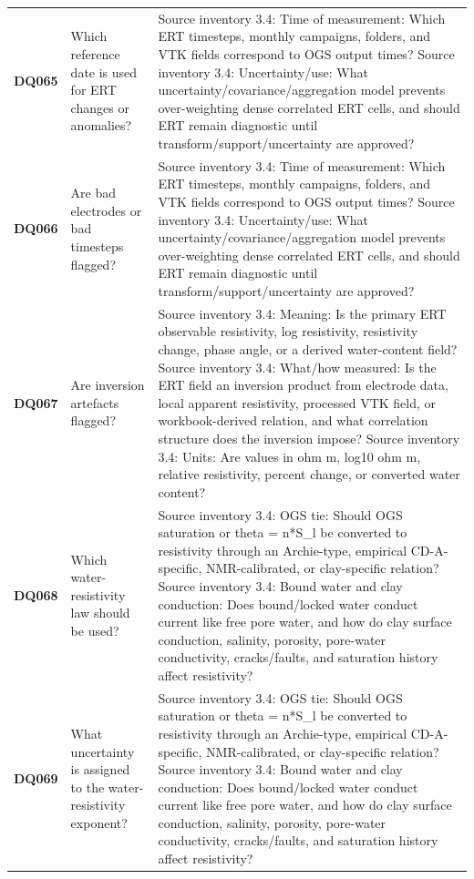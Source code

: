 \begin{longtable}{@{}L{0.09\textwidth} L{0.31\textwidth} L{0.52\textwidth}@{}}
\addlinespace[0.18em]
\textbf{DQ065} & Which reference date is used for ERT changes or anomalies? & Source inventory 3.4: Time of measurement: Which ERT timesteps, monthly campaigns, folders, and VTK fields correspond to OGS output times? Source inventory 3.4: Uncertainty/use: What uncertainty/covariance/aggregation model prevents over-weighting dense correlated ERT cells, and should ERT remain diagnostic until transform/support/uncertainty are approved?\\
\addlinespace[0.18em]
\textbf{DQ066} & Are bad electrodes or bad timesteps flagged? & Source inventory 3.4: Time of measurement: Which ERT timesteps, monthly campaigns, folders, and VTK fields correspond to OGS output times? Source inventory 3.4: Uncertainty/use: What uncertainty/covariance/aggregation model prevents over-weighting dense correlated ERT cells, and should ERT remain diagnostic until transform/support/uncertainty are approved?\\
\addlinespace[0.18em]
\textbf{DQ067} & Are inversion artefacts flagged? & Source inventory 3.4: Meaning: Is the primary ERT observable resistivity, log resistivity, resistivity change, phase angle, or a derived water-content field? Source inventory 3.4: What/how measured: Is the ERT field an inversion product from electrode data, local apparent resistivity, processed VTK field, or workbook-derived relation, and what correlation structure does the inversion impose? Source inventory 3.4: Units: Are values in ohm m, log10 ohm m, relative resistivity, percent change, or converted water content?\\
\addlinespace[0.18em]
\textbf{DQ068} & Which water-resistivity law should be used? & Source inventory 3.4: OGS tie: Should OGS saturation or theta = n*S\_l be converted to resistivity through an Archie-type, empirical CD-A-specific, NMR-calibrated, or clay-specific relation? Source inventory 3.4: Bound water and clay conduction: Does bound/locked water conduct current like free pore water, and how do clay surface conduction, salinity, porosity, pore-water conductivity, cracks/faults, and saturation history affect resistivity?\\
\addlinespace[0.18em]
\textbf{DQ069} & What uncertainty is assigned to the water-resistivity exponent? & Source inventory 3.4: OGS tie: Should OGS saturation or theta = n*S\_l be converted to resistivity through an Archie-type, empirical CD-A-specific, NMR-calibrated, or clay-specific relation? Source inventory 3.4: Bound water and clay conduction: Does bound/locked water conduct current like free pore water, and how do clay surface conduction, salinity, porosity, pore-water conductivity, cracks/faults, and saturation history affect resistivity?\\

\end{longtable}
